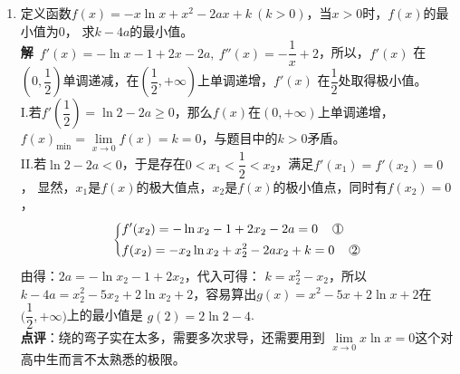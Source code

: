 \begin{enumerate}[label={【\textbf{例\thechapter.\arabic*}】},
 leftmargin=\inteval{\myenumleftmargin}pt,
 itemsep=\inteval{\myenumitempsep}pt,
 itemindent=\inteval{\myenumitemindent}pt]
\item 定义函数$ f(x)=-x\ln x+x^2-2ax+k \ (k>0) $，当$ x>0 $时，$ f(x) $的最小值为0，
求$ k-4a $的最小值。\\
\textbf{解}\ $ f'(x)=-\ln x-1+2x-2a,\ f''(x)=-\dfrac{1}{x}+2 $，所以，$ f'(x) $
在$ (0,\dfrac{1}{2}) $单调递减，在$ (\dfrac{1}{2},+\infty) $上单调递增，$ f'(x) $
在$ \dfrac{1}{2} $处取得极小值。\\
I.若$ f'(\dfrac{1}{2})=\ln2-2a\geq 0 $，那么$ f(x) $在$ (0,+\infty) $上单调递增，
$ f(x)_{\min}=\lim\limits_{x\to 0}f(x)=k=0 $，与题目中的$ k>0 $矛盾。\\
II.若$ \ln2-2a < 0 $，于是存在$ 0<x_1<\dfrac{1}{2}<x_2 $，满足$ f'(x_1)=f'(x_2)=0 $，
显然，$ x_1 $是$ f(x) $的极大值点，$ x_2 $是$ f(x) $的极小值点，同时有$ f(x_2)=0 $，
\begin{align*} \left\{
    \begin{aligned}
        & f'(x_2)=-\ln x_2-1+2x_2-2a=0  \quad\mycircled{1} \\
        & f(x_2)=-x_2\ln x_2+x_2^2-2ax_2+k=0 \quad\mycircled{2}
    \end{aligned} \right.
\end{align*}
由得：$ 2a=-\ln x_2-1+2x_2 $，代入可得：
$ k=x_2^2-x_2 $，所以$ k-4a=x_2^2-5x_2+2\ln x_2+2 $，容易算出$ g(x)=x^2-5x+
2\ln x+2 $在$ \Big(\dfrac{1}{2},+\infty\Big) $上的最小值是
$ g(2)=2\ln 2-4 $. \\
\textbf{点评}：绕的弯子实在太多，需要多次求导，还需要用到
$ \lim\limits_{x\to 0} x\ln x=0 $这个对高中生而言不太熟悉的极限。\\

\end{enumerate}
\cleardoublepage
%


